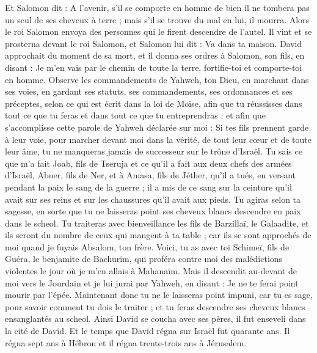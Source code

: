 \begin{multicols}{2}
Et Salomon dit : A l’avenir, s’il se comporte en homme de bien il ne tombera pas un seul de ses cheveux à terre ; mais s'il se trouve du mal en lui, il mourra.
Alors le roi Salomon envoya des personnes qui le firent descendre de l'autel. Il vint et se prosterna devant le roi Salomon, et Salomon lui dit : Va dans ta maison.
\VerseOne{}David approchait du moment de sa mort, et il donna ses ordres à Salomon, son fils, en disant :
Je m'en vais par le chemin de toute la terre, fortifie-toi et comporte-toi en homme.
Observe les commandements de Yahweh, ton Dieu, en marchant dans ses voies, en gardant ses statuts, ses commandements, ses ordonnances et ses préceptes, selon ce qui est écrit dans la loi de Moïse, afin que tu réussisses dans tout ce que tu feras et dans tout ce que tu entreprendras ;
et afin que s’accomplisse cette parole de Yahweh déclarée sur moi : Si tes fils prennent garde à leur voie, pour marcher devant moi dans la vérité, de tout leur cœur et de toute leur âme, tu ne manqueras jamais de successeur sur le trône d'Israël.
Tu sais ce que m'a fait Joab, fils de Tseruja et ce qu'il a fait aux deux chefs des armées d'Israël, Abner, fils de Ner, et à Amasa, fils de Jéther, qu'il a tués, en versant pendant la paix le sang de la guerre ; il a mis de ce sang sur la ceinture qu'il avait sur ses reins et sur les chaussures qu'il avait aux pieds.
Tu agiras selon ta sagesse, en sorte que tu ne laisseras point ses cheveux blancs descendre en paix dans le scheol.
Tu traiteras avec bienveillance les fils de Barzillaï, le Galaadite, et ils seront du nombre de ceux qui mangent à ta table ; car ils se sont approchés de moi quand je fuyais Absalom, ton frère.
Voici, tu as avec toi Schimeï, fils de Guéra, le benjamite de Bachurim, qui proféra contre moi des malédictions violentes le jour où je m'en allais à Mahanaïm. Mais il descendit au-devant de moi vers le Jourdain et je lui jurai par Yahweh, en disant : Je ne te ferai point mourir par l'épée.
Maintenant donc tu ne le laisseras point impuni, car tu es sage, pour savoir comment tu dois le traiter ; et tu feras descendre ses cheveux blancs ensanglantés au scheol.
Ainsi David se coucha avec ses pères, il fut enseveli dans la cité de David.
Et le temps que David régna sur Israël fut quarante ans. Il régna sept ans à Hébron et il régna trente-trois ans à Jérusalem.

\end{multicols}
